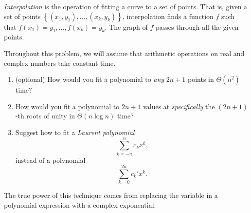 \documentclass{article}
\begin{document}
\begin{question}
\emph{Interpolation} is the operation of fitting a curve to a set of points. That is, given a set of points $\left\{(x_1, y_1), \dots, (x_k, y_k)\right\}$, interpolation finds a function $f$ such that $f(x_1) = y_1, \dots, f(x_k) = y_k$. The graph of $f$ passes through all the given points.

Throughout this problem, we will assume that arithmetic operations on real and complex numbers take constant time.

\begin{enumerate}[label=(\alph*)]
    \item (optional) How would you fit a polynomial to \emph{any} $2n+1$ points in $\Theta(n^2)$ time?

    \item How would you fit a polynomial to $2n+1$ values at \emph{specifically} the $(2n+1)$-th roots of unity in $\Theta(n \log n)$ time?

    \item Suggest how to fit a \emph{Laurent polynomial} \[ \sum_{k=-n}^n c_k x^k, \] instead of a polynomial \[ \sum_{k=0}^{2n} c_k' x^k. \]
\end{enumerate}

The true power of this technique comes from replacing the variable in a polynomial expression with a complex exponential.


\end{question}
\end{document}
